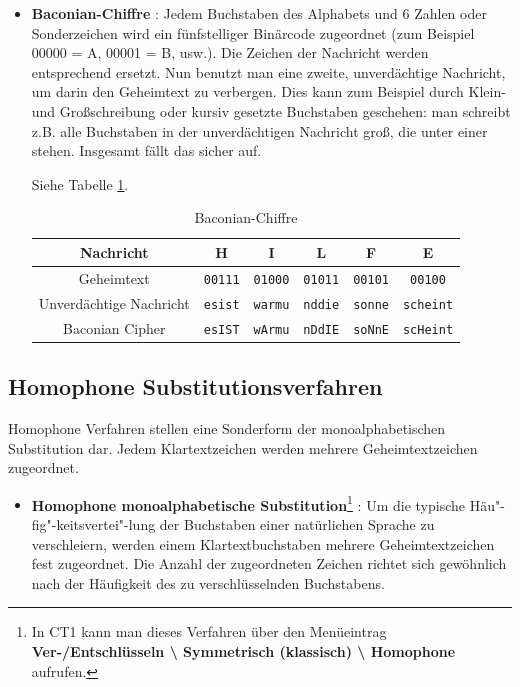 \begin{refsegment}
\begin{itemize}
\item \textbf{Baconian-Chiffre} \cite{ACA2002}:
   Jedem Buchstaben des Alphabets und 6 Zahlen oder Sonderzeichen wird ein
   fünfstelliger Binärcode zugeordnet (zum Beispiel 00000 = A, 00001 = B,
   usw.). Die Zeichen der Nachricht werden entsprechend ersetzt. Nun benutzt
   man eine zweite, unverdächtige Nachricht, um darin den Geheimtext zu
   verbergen. Dies kann zum Beispiel durch Klein- und Großschreibung oder
   kursiv gesetzte Buchstaben geschehen: man schreibt z.B. alle Buchstaben
   in der unverdächtigen Nachricht groß, die unter einer \grqq~
   stehen. Insgesamt fällt das sicher auf.

   Siehe Tabelle \ref{Baconian-table-reference}.

   \begin{table}[ht]
   \begin{center}
   \begin{tabular}{|c|ccccc|}
   \hline
        Nachricht                &  H   &   I   &   L   &   F   &   E     \\
   \hline
	Geheimtext               & {\tt 00111} & {\tt 01000} & {\tt 01011} & {\tt 00101} & {\tt 00100}   \\
	Unverdächtige Nachricht & {\tt esist} & {\tt warmu} & {\tt nddie} & {\tt sonne} & {\tt scheint} \\
   \hline
	Baconian Cipher          & {\tt esIST} & {\tt wArmu} & {\tt nDdIE} & {\tt soNnE} & {\tt scHeint} \\
   \hline
   \end{tabular}
   \caption{Baconian-Chiffre}
   \label{Baconian-table-reference}
   \end{center}
   \end{table}

   \end{itemize}


\subsection{Homophone Substitutionsverfahren}

Homophone Verfahren stellen eine Sonderform der
monoalphabetischen Substitution dar. Jedem Klartextzeichen werden mehrere
Geheimtextzeichen zugeordnet.

\begin{itemize}

\item \textbf{Homophone monoalphabetische Substitution}\footnote{In CT1
   kann man dieses Verfahren über den Menüeintrag \textbf{Ver-/Entschlüsseln
   \textbackslash{} Symmetrisch (klassisch) \textbackslash{} Homophone}
   aufrufen.}
   \cite{Singh2001}:
   Um die typische Häu"-fig"-keitsvertei"-lung der Buchstaben einer natürlichen
   Sprache zu verschleiern, werden einem Klartextbuchstaben mehrere
   Geheimtextzeichen fest zugeordnet. Die Anzahl der zugeordneten Zeichen
   richtet sich gewöhnlich nach der Häufigkeit des zu verschlüsselnden
   Buchstabens.


\end{itemize}
\end{refsegment}
